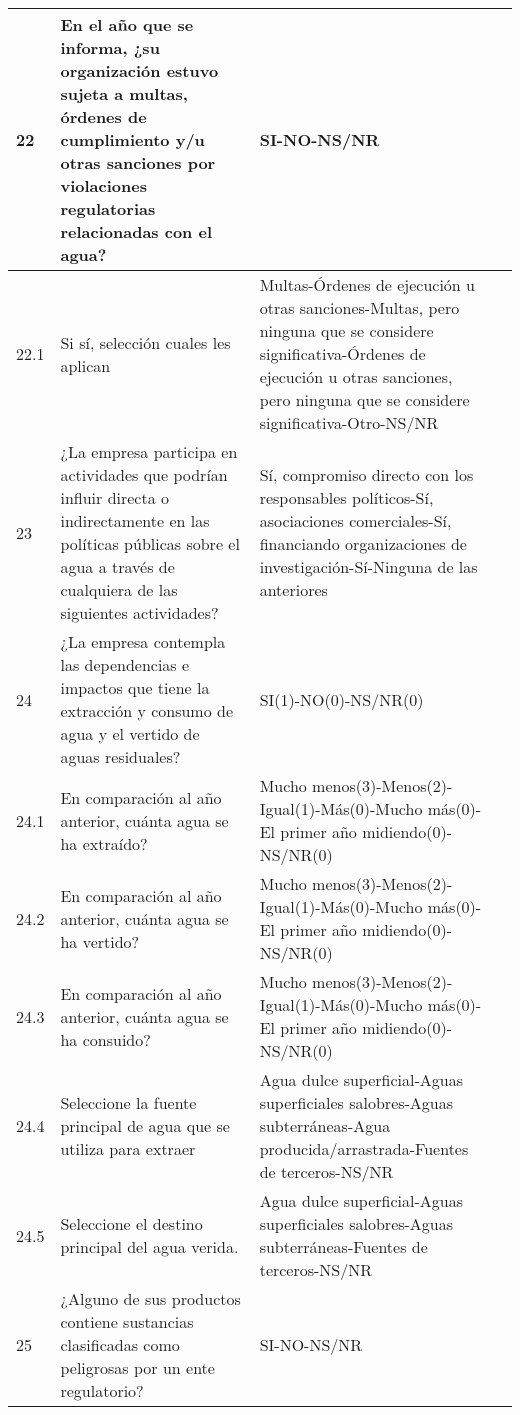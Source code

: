 \begin{longtable}{p{0.75cm}|p{6cm}|p{6cm}|p{2cm}}
\hline
22 & En el año que se informa, ¿su organización estuvo sujeta a multas, órdenes de cumplimiento y/u otras sanciones por violaciones regulatorias relacionadas con el agua? & SI-NO-NS/NR & \parencite{disclosure-insight-action-2023} \\
\hline
22.1 & Si sí, selección cuales les aplican & Multas-Órdenes de ejecución u otras sanciones-Multas, pero ninguna que se considere significativa-Órdenes de ejecución u otras sanciones, pero ninguna que se considere significativa-Otro-NS/NR & \parencite{disclosure-insight-action-2023} \\
\hline
23 & ¿La empresa participa en actividades que podrían influir directa o indirectamente en las políticas públicas sobre el agua a través de cualquiera de las siguientes actividades? & Sí, compromiso directo con los responsables políticos-Sí, asociaciones comerciales-Sí, financiando organizaciones de investigación-Sí-Ninguna de las anteriores & \parencite{disclosure-insight-action-2023} \\
\hline
24 & ¿La empresa contempla las dependencias e impactos que tiene la extracción y consumo de agua y el vertido de aguas residuales? & SI(1)-NO(0)-NS/NR(0) & \parencite{ceres-2023A} \\
\hline
24.1 & En comparación al año anterior, cuánta agua se ha extraído? & Mucho menos(3)-Menos(2)-Igual(1)-Más(0)-Mucho más(0)-El primer año midiendo(0)-NS/NR(0) & \parencite{disclosure-insight-action-2023} \\
\hline
24.2 & En comparación al año anterior, cuánta agua se ha vertido? & Mucho menos(3)-Menos(2)-Igual(1)-Más(0)-Mucho más(0)-El primer año midiendo(0)-NS/NR(0) & \parencite{disclosure-insight-action-2023} \\
\hline
24.3 & En comparación al año anterior, cuánta agua se ha consuido? & Mucho menos(3)-Menos(2)-Igual(1)-Más(0)-Mucho más(0)-El primer año midiendo(0)-NS/NR(0) & \parencite{disclosure-insight-action-2023} \\
\hline
24.4 & Seleccione la fuente principal de agua que se utiliza para extraer & Agua dulce superficial-Aguas superficiales salobres-Aguas subterráneas-Agua producida/arrastrada-Fuentes de terceros-NS/NR & \parencite{disclosure-insight-action-2023} \\
\hline
24.5 & Seleccione el destino principal del agua verida. & Agua dulce superficial-Aguas superficiales salobres-Aguas subterráneas-Fuentes de terceros-NS/NR & \parencite{disclosure-insight-action-2023} \\
\hline
25 & ¿Alguno de sus productos contiene sustancias clasificadas como peligrosas por un ente regulatorio? & SI-NO-NS/NR & \parencite{disclosure-insight-action-2023} \\

\end{longtable}
